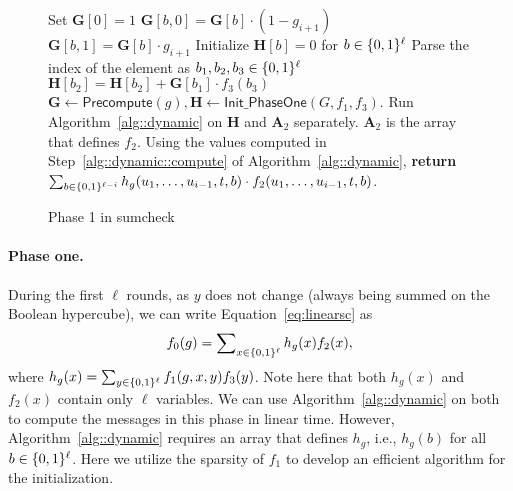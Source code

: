 \begin{figure}[b!]
\vspace{-.5in}
	\begin{algorithm}[H]
		\caption{Phase 1 in sumcheck}\label{alg::phase1}
		\begin{algorithmic}[1]
			    
			\State Set $\textbf{G}[0] = 1$
			\State $\textbf{G}[b,0] = \textbf{G}[b]\cdot(1-g_{i+1})$ 
			\State $\textbf{G}[b,1] = \textbf{G}[b]\cdot g_{i+1}$
			\EndFor
			\EndFor
			\EndProcedure
			 
			\State Initialize $\textbf{H}[b] = 0$ for $b\in\{0,1\}^\ell$
			\State Parse the index of the element as $b_1,b_2,b_3\in\{0,1\}^\ell$
			\State\label{alg::phase1::init} $\textbf{H}[b_2] = \textbf{H}[b_2]+ \textbf{G}[b_1]\cdot f_3(b_3)$
			\EndFor
			\EndProcedure
			\State $\textbf{G}\leftarrow\mathsf{Precompute}(g), \textbf{H}\leftarrow\mathsf{Init\_PhaseOne}(G,f_1, f_3)$. 
			\State Run Algorithm~\ref{alg::dynamic} on $\textbf{H}$ and $\textbf{A}_2$ separately. $\textbf{A}_2$ is the array that defines $f_2$. Using the values computed in Step~\ref{alg::dynamic::compute} of Algorithm~\ref{alg::dynamic},
			\State \textbf{return}  $\sum_{b\in\{0,1\}^{\ell-i}}h_g(u_1,\ldots, u_{i-1}, t, b)\cdot f_2(u_1,\ldots, u_{i-1}, t, b)$.
			\EndFor
			\EndFor
			\EndProcedure
		\end{algorithmic}
	\end{algorithm}
	\vspace{-.5in}
\end{figure}



\paragraph{Phase one.} 
During the first $\ell$ rounds, as $y$ does not change (always being summed on the Boolean hypercube), we can write Equation~\ref{eq:linearsc} as 
\[
f_0(g) = \sum\nolimits_{x\in\{0,1\}^\ell} h_g(x)f_2(x),
\]
where $h_g(x) = \sum_{y\in\{0,1\}^\ell}f_1(g,x,y)f_3(y)$. Note here that both $h_g(x)$ and $f_2(x)$ contain only $\ell$ variables. We can use Algorithm~\ref{alg::dynamic} on both to compute the messages in this phase in linear time. However, Algorithm~\ref{alg::dynamic} requires an array that defines $h_g$, i.e., $h_g(b)$ for all $b\in\{0,1\}^\ell$. Here we utilize the sparsity of $f_1$ to develop an efficient algorithm for the initialization.


